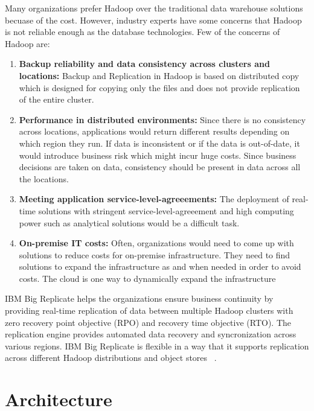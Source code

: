 Many organizations prefer Hadoop over the traditional data warehouse solutions
becuase of the cost. However, industry experts have some concerns that Hadoop is
not reliable enough as the database technologies. Few of the concerns of Hadoop
are:
\begin{enumerate}[label= (\roman*)]
\item \textbf{Backup reliability and data  consistency across clusters and
locations:} Backup and Replication in Hadoop is based on distributed copy which 
is designed for copying only the files and does not provide replication of the
entire cluster.
\item \textbf{Performance in distributed environments:} Since there is no
consistency across locations, applications would return different results
depending on which region they run. If data is inconsistent or if the data is
out-of-date, it would introduce business risk which might incur huge costs. 
Since business decisions are taken on data, consistency should be present in 
data across all the locations. 
\item \textbf{Meeting application service-level-agreeements:} The deployment of
real-time solutions with stringent service-level-agreeement and high computing
power such as analytical solutions would be a difficult task.	
\item \textbf{On-premise IT costs:} Often, organizations would need to come up
with solutions to reduce costs for on-premise infrastructure. They need to find
solutions to expand the infrastructure as and when needed in order to avoid 
costs. The cloud is one way to dynamically expand the infrastructure
\end{enumerate}
IBM Big Replicate helps the organizations ensure business continuity by
providing real-time replication of data between multiple Hadoop clusters with 
zero recovery point objective (RPO) and recovery time objective (RTO). The
replication engine provides automated data recovery and syncronization across 
various regions.  IBM Big Replicate is flexible in a way that it supports 
replication across different Hadoop distributions and object stores
~\cite{hid-sp18-408-IBMBigReplicate-intro}.

\section{Architecture}

